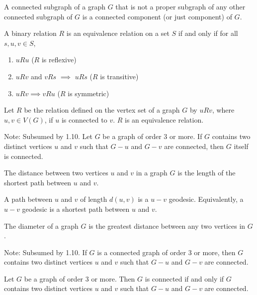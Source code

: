 \documentclass{article}
\begin{document}
\medskip{}

    A connected subgraph of a graph $G$ that is not a proper subgraph of any other connected subgraph of $G$ is a connected component (or just component) of $G$.

\medskip{}

    A binary relation $R$ is an equivalence relation on a set $S$ if and only if for all $s,u,v \in S$,
    \begin{enumerate}
        \item $u R u$ ($R$ is reflexive)
        \item $u R v$ and $v R s$ $\implies$ $u R s$ ($R$ is transitive)
        \item $u R v \implies v R u$ ($R$ is symmetric)
    \end{enumerate}

\medskip{}

    Let $R$ be the relation defined on the vertex set of a graph $G$ by $u R v$, where $u,v \in V(G)$, if $u$ is connected to $v$. $R$ is an equivalence relation.

\medskip{}

    Note: Subsumed by 1.10.
    Let $G$ be a graph of order 3 or more. If $G$ contains two distinct vertices $u$ and $v$ such that $G - u$ and $G - v$ are connected, then $G$ itself is connected.

\medskip{}

    The distance between two vertices $u$ and $v$ in a graph $G$ is the length of the shortest path between $u$ and $v$.

\medskip{}

    A path between $u$ and $v$ of length $d(u,v)$ is a $u-v$ geodesic. Equivalently, a $u-v$ geodesic is a shortest path between $u$ and $v$.

\medskip{}

    The diameter of a graph $G$ is the greatest distance between any two vertices in $G$.

\medskip{}

    Note: Subsumed by 1.10.
    If $G$ is a connected graph of order 3 or more, then $G$ contains two distinct vertices $u$ and $v$ such that $G - u$ and $G - v$ are connected.

\medskip{}

    Let $G$ be a graph of order 3 or more. Then $G$ is connected if and only if $G$ contains two distinct vertices $u$ and $v$ such that $G - u$ and $G - v$ are connected.
\end{document}
